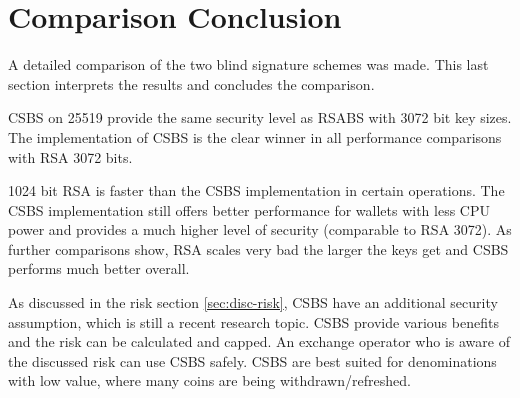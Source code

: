 \section{Comparison Conclusion}
\label{sec:disc-comp-conclusion}
A detailed comparison of the two blind signature schemes was made.
This last section interprets the results and concludes the comparison.

\gls{CSBS} on \gls{25519} provide the same security level as \gls{RSABS} with 3072 bit key sizes.
The implementation of \gls{CSBS} is the clear winner in all performance comparisons with RSA 3072 bits.

1024 bit RSA is faster than the \gls{CSBS} implementation in certain operations.
The \gls{CSBS} implementation still offers better performance for wallets with less CPU power and provides a much higher level of security (comparable to RSA 3072).
As further comparisons show, RSA scales very bad the larger the keys get and \gls{CSBS} performs much better overall.

As discussed in the risk section \ref{sec:disc-risk}, \gls{CSBS} have an additional security assumption, which is still a recent research topic.
\gls{CSBS} provide various benefits and the risk can be calculated and capped.
An exchange operator who is aware of the discussed risk can use \gls{CSBS} safely.
\gls{CSBS} are best suited for denominations with low value, where many coins are being withdrawn/refreshed.

